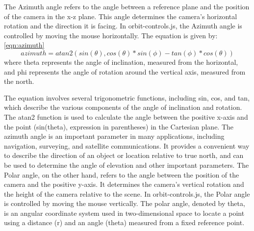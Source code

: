 The Azimuth angle refers to the angle between a reference plane and the position of the camera in 
the x-z plane. This angle determines the camera's horizontal rotation and the direction it is facing. 
In orbit-controls.js, the Azimuth angle is controlled by moving the mouse horizontally.
The equation is given by: \ref{eqn:azimuth}
\begin{equation}
  \label{eqn:azimuth}
	azimuth = atan2(sin(\theta), cos(\theta)*sin(\phi) - tan(\phi)*cos(\theta))
\end{equation}
where theta represents the angle of inclination, measured from the horizontal, and phi represents the angle 
of rotation around the vertical axis, measured from the north.

The equation involves several trigonometric functions, including sin, cos, and tan, which describe the various 
components of the angle of inclination and rotation. The atan2 function is used to calculate the angle between 
the positive x-axis and the point (sin(theta), expression in parentheses) in the Cartesian plane.
The azimuth angle is an important parameter in many applications, including navigation, surveying, and satellite communications. 
It provides a convenient way to describe the direction of an object or location relative to true north, 
and can be used to determine the angle of elevation and other important parameters.
The Polar angle, on the other hand, refers to the angle between the position of the camera and the 
positive y-axis. It determines the camera's vertical rotation and the height of the camera relative 
to the scene. In orbit-controls.js, the Polar angle is controlled by moving the mouse vertically.
The polar angle, denoted by theta, is an angular coordinate system used in two-dimensional space to locate 
a point using a distance (r) and an angle (theta) measured from a fixed reference point.


